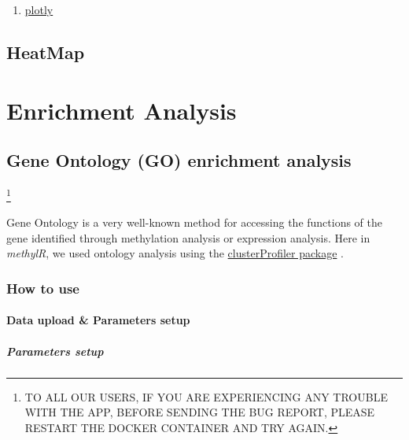 \documentclass[
  a4paper,
  oneside,
  open=any]{scrreport}
\providecommand{\tightlist}{%
  \setlength{\itemsep}{0pt}\setlength{\parskip}{0pt}}\usepackage{longtable,booktabs,array}
\begin{document}
\begin{enumerate}
\def\labelenumi{\arabic{enumi}.}
\tightlist
\item
  \href{https://cran.r-project.org/web/packages/plotly/plotly.pdf}{plotly}
\end{enumerate}

\hypertarget{heatmap}{%
\chapter{HeatMap}\label{heatmap}}

\part{Enrichment Analysis}

\hypertarget{sec-go}{%
\chapter{Gene Ontology (GO) enrichment analysis}\label{sec-go}}

\footnote{TO ALL OUR USERS, IF YOU ARE EXPERIENCING ANY TROUBLE WITH THE
  APP, BEFORE SENDING THE BUG REPORT, PLEASE RESTART THE DOCKER
  CONTAINER AND TRY AGAIN.}

Gene Ontology is a very well-known method for accessing the functions of
the gene identified through methylation analysis or expression analysis.
Here in \emph{methylR}, we used ontology analysis using the
\href{https://bioconductor.org/packages/release/bioc/html/clusterProfiler.html}{clusterProfiler
package} \autocite{yu2012clusterprofiler,wu2021clusterprofiler}.

\hypertarget{how-to-use-4}{%
\section{How to use}\label{how-to-use-4}}

\hypertarget{data-upload-parameters-setup}{%
\subsection{Data upload \& Parameters
setup}\label{data-upload-parameters-setup}}

\hypertarget{parameters-setup}{%
\subsubsection{Parameters setup}\label{parameters-setup}}
\end{document}
